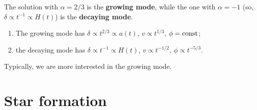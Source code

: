 \documentclass[main.tex]{subfiles}
\begin{document}
The solution with \(\alpha = 2/3\) is the \textbf{growing mode}, while the one with \(\alpha = -1\) (so, \(\delta \propto t^{-1} \propto H(t)\)) is the \textbf{decaying mode}. 

\begin{enumerate}
  \item The growing mode has \(\delta \propto t^{2/3} \propto a(t)\), \(v \propto t^{1/3}\), \(\phi = \text{const}\);
  \item the decaying mode has \(\delta \propto t^{-1} \propto H(t)\), \(v \propto t^{-1/2}\), \(\phi \propto t^{-5/3}\). 
\end{enumerate}

Typically, we are more interested in the growing mode.  


% 


%
\section{Star formation}



\end{document}
